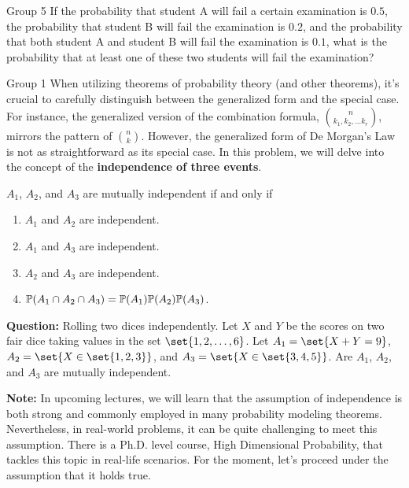 \documentclass{article}
\begin{document}
\begin{problem}
    {Group 5}
    If the probability that student A will fail a certain examination is $0.5$, the probability that student B will fail the examination is $0.2$, and the probability that both student A and student B will fail the examination is $0.1$, what is the probability that at least one of these two students will fail the examination?
\end{problem}
\fi
\iffalse
\begin{problem}
    {Group 1}
    When utilizing theorems of probability theory (and other theorems), it's crucial to carefully distinguish between the generalized form and the special case. For instance, the generalized version of the combination formula, $\binom{n}{k_1,k_2,\ldots k_r}$, mirrors the pattern of $\binom{n}{k}$. However, the generalized form of De Morgan's Law is not as straightforward as its special case. In this problem, we will delve into the concept of the \textbf{independence of three events}.
    \begin{definition}
        $A_1$, $A_2$, and $A_3$ are mutually independent if and only if
        \begin{enumerate}
            \item $A_1$ and $A_2$ are independent.
            \item $A_1$ and $A_3$ are independent.
            \item $A_2$ and $A_3$ are independent.
            \item $\P{A_1\cap A_2\cap A_3}=\P{A_1}\P{A_2}\P{A_3}$.
        \end{enumerate}
    \end{definition}
    \textbf{Question:} Rolling two dices independently. Let $X$ and $Y$ be the scores on two fair dice taking values in the set $\set{1,2,\ldots,6}$. Let $A_1 = \set{X+Y=9}$, $A_2=\set{X\in \set{1,2,3}}$, and $A_3=\set{X\in\set{3,4,5}}$. Are $A_1$, $A_2$, and $A_3$ are mutually independent.

    \textbf{Note:} In upcoming lectures, we will learn that the assumption of independence is both strong and commonly employed in many probability modeling theorems. Nevertheless, in real-world problems, it can be quite challenging to meet this assumption. There is a Ph.D. level course, High Dimensional Probability, that tackles this topic in real-life scenarios. For the moment, let's proceed under the assumption that it holds true.
\end{problem}
\end{document}

